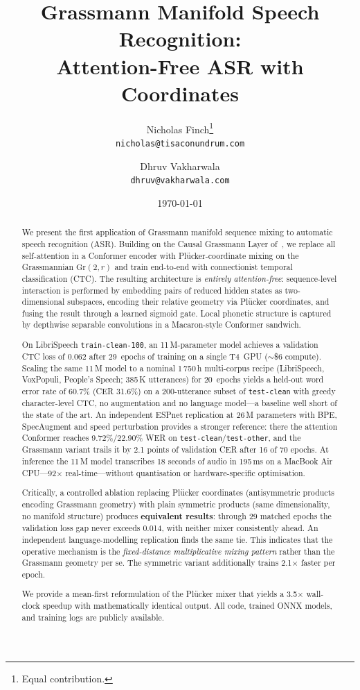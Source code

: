 \documentclass[11pt,a4paper]{article}
\title{%
  Grassmann Manifold Speech Recognition:\\
  Attention-Free ASR with \plucker{} Coordinates
}
\author{
  Nicholas Finch\thanks{Equal contribution.} \\
  \texttt{nicholas@tisaconundrum.com} \\
  \and
  Dhruv Vakharwala\footnotemark[1] \\
  \texttt{dhruv@vakharwala.com} \\
}
\date{\today}
\newcommand{\Gr}{\mathrm{Gr}}
\newcommand{\plucker}{Pl\"{u}cker}
\begin{document}
\maketitle

\begin{abstract}
We present the first application of Grassmann manifold sequence mixing
to automatic speech recognition (ASR).  Building on the Causal Grassmann
Layer of~\citet{dong2025attention}, we replace all self-attention in a
Conformer encoder with \plucker{}-coordinate mixing on the Grassmannian
$\Gr(2,r)$ and train end-to-end with connectionist temporal
classification (CTC).  The resulting architecture is \emph{entirely
attention-free}: sequence-level interaction is performed by embedding
pairs of reduced hidden states as two-dimensional subspaces, encoding
their relative geometry via \plucker{} coordinates, and fusing the
result through a learned sigmoid gate.  Local phonetic structure is
captured by depthwise separable convolutions in a Macaron-style
Conformer sandwich.

On LibriSpeech \texttt{train-clean-100}, an 11\,M-parameter model
achieves a validation CTC loss of 0.062 after 29~epochs of training on
a single T4~GPU (\(\sim\)\$6 compute).  Scaling the same 11\,M model to
a nominal 1\,750\,h multi-corpus recipe (LibriSpeech, VoxPopuli,
People's Speech; 385\,K utterances) for 20~epochs yields a held-out
word error rate of 60.7\% (CER 31.6\%) on a 200-utterance subset of
\texttt{test-clean} with greedy character-level CTC, no augmentation
and no language model---a baseline well short of the state of the art.
An independent ESPnet replication at 26\,M parameters with BPE,
SpecAugment and speed perturbation provides a stronger reference: there
the attention Conformer reaches 9.72\%/22.90\% WER on
\texttt{test-clean}/\texttt{test-other}, and the Grassmann variant
trails it by 2.1 points of validation CER after 16 of 70 epochs.
At inference the 11\,M model transcribes 18 seconds of audio in 195\,ms
on a MacBook Air CPU---92$\times$ real-time---without quantisation or
hardware-specific optimisation.

Critically, a controlled ablation replacing \plucker{} coordinates
(antisymmetric products encoding Grassmann geometry) with plain
symmetric products (same dimensionality, no manifold structure)
produces \textbf{equivalent results}: through 29 matched epochs the
validation loss gap never exceeds 0.014, with neither mixer consistently
ahead.  An independent language-modelling replication finds the same
tie.  This indicates that the operative mechanism is the
\emph{fixed-distance multiplicative mixing pattern} rather than the
Grassmann geometry per se.  The symmetric variant additionally trains
2.1$\times$ faster per epoch.

We provide a mean-first reformulation of the \plucker{} mixer that
yields a 3.5$\times$ wall-clock speedup with mathematically identical
output.  All code, trained ONNX models, and training logs are publicly
available.
\end{abstract}
\end{document}
